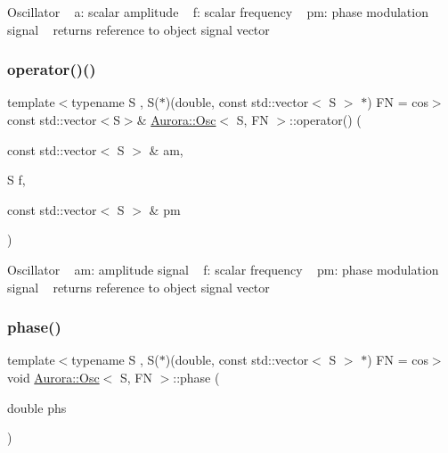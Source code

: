 Oscillator ~\newline
a\+: scalar amplitude ~\newline
f\+: scalar frequency ~\newline
pm\+: phase modulation signal ~\newline
returns reference to object signal vector \mbox{\label{class_aurora_1_1_osc_a6a339a71db41fbbd944dd603c986b81d}} 
\subsubsection{\texorpdfstring{operator()()}{operator()()}\hspace{0.1cm}{\footnotesize\ttfamily [6/6]}}
{\footnotesize\ttfamily template$<$typename S , S($\ast$)(double, const std\+::vector$<$ S $>$ $\ast$) FN = cos$>$ \\
const std\+::vector$<$S$>$\& \hyperlink{class_aurora_1_1_osc}{Aurora\+::\+Osc}$<$ S, FN $>$\+::operator() (\begin{DoxyParamCaption}\item[{const std\+::vector$<$ S $>$ \&}]{am,  }\item[{S}]{f,  }\item[{const std\+::vector$<$ S $>$ \&}]{pm }\end{DoxyParamCaption})\hspace{0.3cm}{\ttfamily [inline]}}

Oscillator ~\newline
am\+: amplitude signal ~\newline
f\+: scalar frequency ~\newline
pm\+: phase modulation signal ~\newline
returns reference to object signal vector \mbox{\label{class_aurora_1_1_osc_a93770f94cde427c999be8a7b6c8a1cc9}} 
\subsubsection{\texorpdfstring{phase()}{phase()}}
{\footnotesize\ttfamily template$<$typename S , S($\ast$)(double, const std\+::vector$<$ S $>$ $\ast$) FN = cos$>$ \\
void \hyperlink{class_aurora_1_1_osc}{Aurora\+::\+Osc}$<$ S, FN $>$\+::phase (\begin{DoxyParamCaption}\item[{double}]{phs }\end{DoxyParamCaption})\hspace{0.3cm}{\ttfamily [inline]}}

